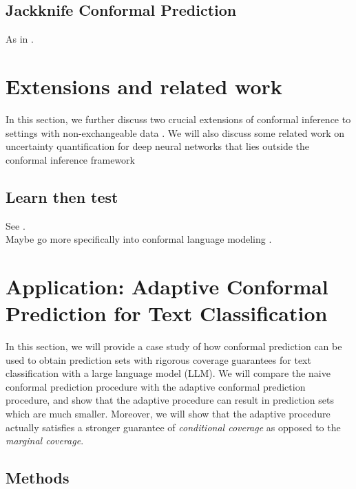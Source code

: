 \documentclass[a4paper, 12pt]{article}
\begin{document}
\subsection*{Jackknife Conformal Prediction}
As in \cite{barberPredictiveInferenceJackknife2020}.



\section*{Extensions and related work}
In this section, we further discuss two crucial extensions of conformal inference
to settings with non-exchangeable data \autocite{gibbsAdaptiveConformalInference2021, tibshiraniConformalPredictionCovariate2020}.
We will also discuss some related work on uncertainty quantification for deep neural networks that lies outside the conformal inference framework

\subsection*{Learn then test}
See \autocite{angelopoulosLearnThenTest2022}. \\
Maybe go more specifically into conformal language modeling \autocite{quachConformalLanguageModeling2023}.

\section*{Application: Adaptive Conformal Prediction for Text Classification}
In this section, we will provide a case study of how conformal prediction can be used to obtain
prediction sets with rigorous coverage guarantees for text classification with a large language model (LLM). We will
compare the naive conformal prediction procedure with the adaptive conformal prediction procedure, and show that the
adaptive procedure can result in prediction sets which are much smaller. Moreover, we will show that the adaptive procedure actually satisfies a stronger guarantee of \textit{conditional coverage} as opposed to the \textit{marginal coverage}.

\subsection*{Methods}
\end{document}
